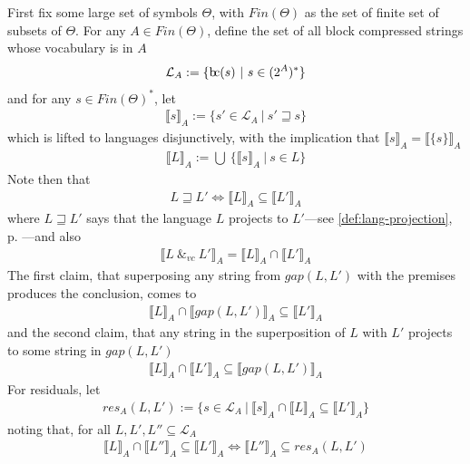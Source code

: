 \documentclass[a4paper,12pt,leqno]{article}
\newcommand{\bc}{{\rm b\!c}}
\newcommand{\spvc}{~\&_{v\!c}~}
\begin{document}
First fix some large set of symbols $\Theta$, with $Fin(\Theta)$ as the set of finite set of subsets of $\Theta$. For any $A \in Fin(\Theta)$, define the set of all block compressed strings whose vocabulary is in $A$
\begin{align}
	\mathcal{L}_A := \{ \bc(s) ~|~ s \in (2^A)^* \}
\end{align}
and for any $s \in Fin(\Theta)^*$, let
\begin{align}
	\llbracket s \rrbracket_A := \{s' \in \mathcal{L}_A ~|~ s' \sqsupseteq s\}
\end{align}
which is lifted to languages disjunctively, with the implication that $\llbracket s \rrbracket_A = \llbracket \{s\} \rrbracket_A$
\begin{align}
	\llbracket L \rrbracket_A := \bigcup ~ \{\llbracket s \rrbracket_A ~|~ s \in L \}
\end{align}
Note then that
\begin{align}
	L \sqsupseteq L' \Longleftrightarrow \llbracket L \rrbracket_A \subseteq \llbracket L' \rrbracket_A
\end{align}
where $L \sqsupseteq L'$ says that the language $L$ projects to $L'$---see \cref{def:lang-projection}, p. \pageref{def:lang-projection}---and also
\begin{align}
	\llbracket L \spvc L' \rrbracket_A = \llbracket L \rrbracket_A \cap \llbracket L' \rrbracket_A
\end{align}
The first claim, that superposing any string from $gap(L,L')$ with the premises produces the conclusion, comes to
\begin{align}
	\llbracket L \rrbracket_A \cap \llbracket gap(L, L') \rrbracket_A \subseteq \llbracket L' \rrbracket_A
\end{align}
and the second claim, that any string in the superposition of $L$ with $L'$ projects to some string in $gap(L, L')$
\begin{align}
	\llbracket L \rrbracket_A \cap \llbracket L' \rrbracket_A \subseteq \llbracket gap(L, L') \rrbracket_A
\end{align}
For residuals, let
\begin{align}
	res_A(L, L') := \{s \in \mathcal{L}_A ~|~ \llbracket s \rrbracket_A \cap \llbracket L \rrbracket_A \subseteq \llbracket L' \rrbracket_A \}
\end{align}
noting that, for all $L, L', L'' \subseteq \mathcal{L}_A$
\begin{align}
	\llbracket L \rrbracket_A \cap \llbracket L'' \rrbracket_A \subseteq \llbracket L' \rrbracket_A \Longleftrightarrow \llbracket L'' \rrbracket_A \subseteq res_A(L, L')
\end{align}
\end{document}
